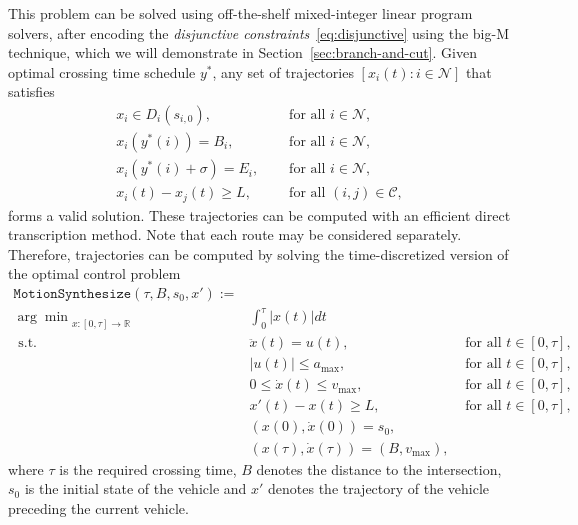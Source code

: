 \documentclass[a4paper]{article}
\theoremstyle{definition}
\theoremstyle{plain}
\begin{document}
This problem can be solved using off-the-shelf mixed-integer linear program solvers,
after encoding the \textit{disjunctive constraints}~\eqref{eq:disjunctive} using
the big-M technique, which we will demonstrate in
Section~\ref{sec:branch-and-cut}. Given optimal crossing time schedule $y^{*}$, any set of trajectories
$[x_{i}(t) : i \in \mathcal{N}]$ that satisfies
\begin{align*}
  x_{i} \in D_{i}(s_{i,0}) , \quad & \text{ for all } i \in \mathcal{N} , \\
  x_{i}(y^{*}(i)) = B_{i} , \quad & \text{ for all } i \in \mathcal{N} , \\
  x_{i}(y^{*}(i) + \sigma) = E_{i} , \quad & \text{ for all } i \in \mathcal{N} , \\
  x_{i}(t) - x_{j}(t) \geq L , \quad & \text{ for all } (i,j) \in \mathcal{C} ,
\end{align*}
forms a valid solution. These trajectories can be computed with an efficient
direct transcription method. Note that each route may be considered separately.
Therefore, trajectories can be computed by solving the time-discretized version
of the optimal control problem
%
\begin{align*}
\texttt{MotionSynthesize}(\tau, B, s_{0}, x') := \\
  {\arg\min}_{x: [0, \tau] \rightarrow \mathbb{R}} & \int_{0}^{\tau} |x(t)| dt \\
  \text{ s.t. } & \ddot{x}(t) = u(t) , &  \text{ for all } t \in [0, \tau] , \\
  & |u(t)| \leq a_{\max} , &  \text{ for all } t \in [0, \tau] , \\
  & 0 \leq \dot{x}(t) \leq v_{\max} , &  \text{ for all } t \in [0, \tau] , \\
  & x'(t) - x(t) \geq L , &  \text{ for all } t \in [0, \tau] , \\
  & (x(0), \dot{x}(0)) = s_{0} , \\
  & (x(\tau), \dot{x}(\tau)) = (B, v_{\max}) ,
\end{align*}
where $\tau$ is the required crossing time, $B$ denotes the distance to
the intersection, $s_{0}$ is the initial state of the vehicle and $x'$ denotes
the trajectory of the vehicle preceding the current vehicle.
\end{document}
